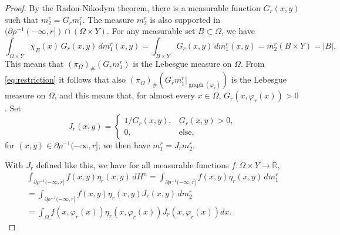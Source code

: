 \documentclass{article}
\newcommand{\R}{\mathbb{R}}
\theoremstyle{definition}
\theoremstyle{remark}
\newcommand{\proj}{\pi}
\newcommand{\projX}{\proj_{\Omega}}
\begin{document}
\begin{proof}
 By the Radon-Nikodym theorem, there is a measurable function $G_r(x,y)$ such that $m^r_2=G_rm^r_1$.
 The measure $m_2^r$ is also supported in $(\partial \rho^{-1}(-\infty,r])\cap(\Omega\times Y)$. For any measurable set $B\subset \Omega$, we have 
 \[\int_{\Omega\times Y}\chi_{B}(x)\,G_r(x,y)\,dm_1^r(x,y) =\int_{B\times Y}G_r(x,y)\,dm_1^r(x,y)=m_2^r(B\times Y)=|B|.\]
  This means that $(\projX)_\#(G_rm^r_1)$ is 
{the} Lebesgue measure on $\Omega$. From \eqref{eq:restriction} it follows that also $(\projX)_\#(G_rm^r_1|_{\operatorname{graph}(\varphi_r)})$ is 
{the} Lebesgue measure on $\Omega$, and this means that, for almost every $x\in \Omega$, $G_r(x,\varphi_r(x))>0$. Set
  \[J_r(x,y)=\begin{cases}1/G_r(x,y),&G_r(x,y)>0,\\0,&\text{else,}\end{cases}\]
  for $(x,y)\in \partial\rho^{-1}(-\infty,r]$; we then have $m_1^r=J_rm_2^r$.
 
 With $J_r$ defined like this, we have %
 for all measurable functions  $f\colon\Omega\times Y\to\R$, 
 \begin{multline}\label{eq:jacobian}
  \int_{\partial\rho^{-1}(-\infty,r]}f(x,y)\eta_r(x,y)\,dH^n=\int_{\partial\rho^{-1}(-\infty,r]}f(x,y)\eta_r(x,y)\,dm^r_1\\
  =\int_{\partial\rho^{-1}(-\infty,r]}f(x,y)\eta_r(x,y)J_r(x,y)\,dm_2^r\\=
  \int_\Omega f(x,\varphi_r(x))\eta_r(x,\varphi_r(x))J_r(x,\varphi_r(x))dx.
 \end{multline}


\end{proof}
\end{document}
